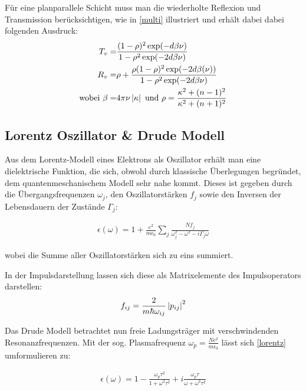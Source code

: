 \documentclass[paper=a4,fontsize=10pt,DIV=18,twocolumn,parskip=half]{scrartcl}
\numberwithin{equation}{section}    %
\begin{document}
Für eine planparallele Schicht muss man die wiederholte Reflexion und 
Transmission berücksichtigen, wie in \cref{multi} illustriert und erhält dabei 
dabei folgenden Ausdruck:
\begin{align}
    T_v= & \frac{(1-\rho)^2 \exp(-d\beta \nu )}{1-\rho^2 \exp (-2d\beta\nu)} \\ 
    \vspace{2em}
    R_v= & \rho+\frac{\rho (1-\rho)^2 \exp (-2 d \beta (\nu ))}{1-\rho^2 \exp(-2 
    d \beta \nu )}\\
    \vspace{2em}
    \text{wobei } \beta= & 4 \pi  \nu  \left| \kappa \right|
    \text{ und }\rho= \frac{\kappa ^2+(n-1)^2}{\kappa ^2+(n+1)^2}
    \label{trans}
\end{align}


\subsection{Lorentz Oszillator \& Drude Modell}

Aus dem Lorentz-Modell eines Elektrons als Oszillator erhält man eine 
dielektrische Funktion, die sich, obwohl durch klassische Überlegungen 
begründet, dem quantenmeschanischem Modell sehr nahe kommt. Dieses ist gegeben 
durch die Übergangsfrequenzen $\omega_j$, den Oszillatorstärken $f_j$ sowie den 
Inversen der Lebensdauern der Zustände $\Gamma_j$:

\begin{align}
    \epsilon(\omega) = 1 + \frac{e^2}{m\epsilon_0}\sum_j\frac{Nf_j}{\omega_j^2 
    - \omega^2 - i\Gamma_j\omega}
    \label{lorentz}
\end{align}

wobei die Summe aller Oszillatorstärken sich zu eins summiert.

In der Impulsdarstellung lassen sich diese als Matrixelemente des 
Impulsoperators darstellen:
\begin{align}
    f_{ij}=\frac{2}{m\hbar\omega_{ij}}\left\lvert p_{ij} \right\rvert ^2
\end{align}


Das Drude Modell betrachtet nun freie Ladungsträger mit verschwindenden 
Resonanzfrequenzen. Mit der sog. Plasmafrequenz 
$\omega_p=\frac{Ne^2}{m\epsilon_0}$ lässt sich \cref{lorentz} umformulieren zu:

\begin{align}
    \epsilon(\omega)=1-\frac{\omega_p\tau^2}{1+\omega^2\tau^2}+
    i\frac{\omega_p\tau}{\omega+\omega^3\tau^2}
    \label{drude}
\end{align}
\end{document}
